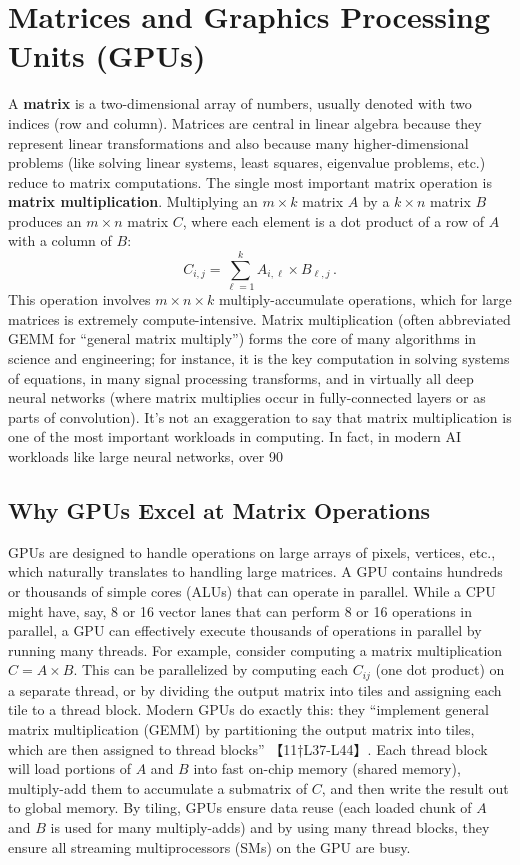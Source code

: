 \section{Matrices and Graphics Processing Units (GPUs)}  
A \textbf{matrix} is a two-dimensional array of numbers, usually denoted with two indices (row and column). Matrices are central in linear algebra because they represent linear transformations and also because many higher-dimensional problems (like solving linear systems, least squares, eigenvalue problems, etc.) reduce to matrix computations. The single most important matrix operation is \textbf{matrix multiplication}. Multiplying an $m\times k$ matrix $A$ by a $k\times n$ matrix $B$ produces an $m\times n$ matrix $C$, where each element is a dot product of a row of $A$ with a column of $B$: 
\[ 
C_{i,j} = \sum_{\ell=1}^{k} A_{i,\ell} \times B_{\ell,j} \,.
\]
This operation involves $m \times n \times k$ multiply-accumulate operations, which for large matrices is extremely compute-intensive. Matrix multiplication (often abbreviated GEMM for “general matrix multiply”) forms the core of many algorithms in science and engineering; for instance, it is the key computation in solving systems of equations, in many signal processing transforms, and in virtually all deep neural networks (where matrix multiplies occur in fully-connected layers or as parts of convolution). It’s not an exaggeration to say that matrix multiplication is one of the most important workloads in computing. In fact, in modern AI workloads like large neural networks, over 90%

\subsection{Why GPUs Excel at Matrix Operations}  
GPUs are designed to handle operations on large arrays of pixels, vertices, etc., which naturally translates to handling large matrices. A GPU contains hundreds or thousands of simple cores (ALUs) that can operate in parallel. While a CPU might have, say, 8 or 16 vector lanes that can perform 8 or 16 operations in parallel, a GPU can effectively execute thousands of operations in parallel by running many threads. For example, consider computing a matrix multiplication $C = A \times B$. This can be parallelized by computing each $C_{ij}$ (one dot product) on a separate thread, or by dividing the output matrix into tiles and assigning each tile to a thread block. Modern GPUs do exactly this: they “implement general matrix multiplication (GEMM) by partitioning the output matrix into tiles, which are then assigned to thread blocks” 【11†L37-L44】. Each thread block will load portions of $A$ and $B$ into fast on-chip memory (shared memory), multiply-add them to accumulate a submatrix of $C$, and then write the result out to global memory. By tiling, GPUs ensure data reuse (each loaded chunk of $A$ and $B$ is used for many multiply-adds) and by using many thread blocks, they ensure all streaming multiprocessors (SMs) on the GPU are busy.

